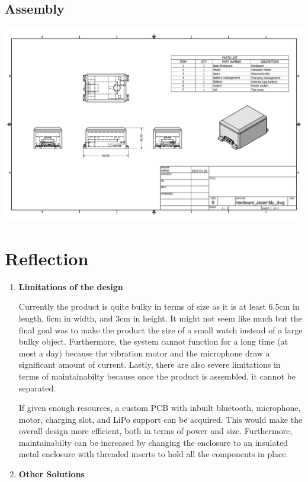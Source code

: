 \documentclass[12pt, titlepage]{article}
\begin{document}
\begin{appendices}
\subsection{Assembly}
	\label{appendix:hardware:assembly}

  \includegraphics[width=\textwidth,height=\textheight,keepaspectratio]{Assembly_drawing.pdf}

  \section{Reflection}
  \label{appendix:reflection}
  
  
  \begin{enumerate}
    \item \textbf{Limitations of the design} 
    
    Currently the product is quite bulky in terms of size as it is at least 6.5cm in length, 6cm in width, and 3cm in height. It might not seem like much but the final goal was to make the product the size of a small watch instead of a large bulky object. Furthermore, the system cannot function for a long time (at most a day) because the vibration motor and the microphone draw a significant amount of current. Lastly, there are also severe limitations in terms of maintainabilty because once the product is assembled, it cannot be separated. 
    
    If given enough resources, a custom PCB with inbuilt bluetooth, microphone, motor, charging slot, and LiPo support can be acquired. This would make the overall design more efficient, both in terms of power and size. Furthermore, maintainabilty can be increased by changing the enclosure to an insulated metal enclosure with threaded inserts to hold all the components in place.       
    \item \textbf{Other Solutions} 
    

\end{enumerate}
\end{appendices}
\end{document}
